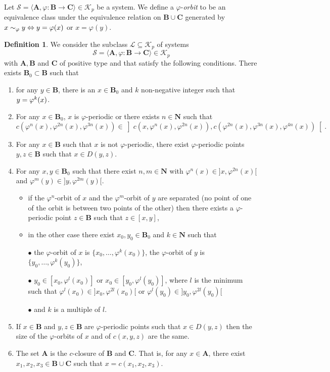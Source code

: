 \documentclass[JEP,XML,SOM,Unicode,NoFloatCountersInSection]{cedram}
\newcommand{\sbullet}{{\scriptscriptstyle\bullet}}
\newcommand\ssi{\mathchoice{\iff}{\Leftrightarrow}{\Leftrightarrow}{\Leftrightarrow}}
\let\mathcal\mathscr
\theoremstyle{plain}
\theoremstyle{definition}
\newtheorem{defn}[thm]{Definition}
\newcommand{\bA}{{\boldsymbol{A}}}
\newcommand{\bB}{{\boldsymbol{B}}}
\newcommand{\bC}{{\boldsymbol{C}}}
\newcommand{\NN}{\mathbf{N}}
\newcommand{\cK}{\mathcal{K}}
\newcommand{\cL}{\mathcal{L}}
\newcommand{\cS}{\mathcal{S}}
\begin{document}
Let $\cS=\langle \bA,\varphi\colon\bB\to\bC\rangle\in\cK_p$ be a system. We define a $\varphi$-\emph{orbit} to be an equivalence class under the equivalence relation on $\bB\cup\bC$ generated by $x\sim_\varphi y\ssi y=\varphi(x)$ or $x=\varphi(y)$.

\begin{defn}\label{class}We consider the subclass $\cL\!\subseteq\!\cK_p$ of systems
\[
\cS=\langle \bA,\varphi\colon\bB\!\to\!\bC\rangle\in\cK_p
\]
with $\bA,\bB$ and $\bC$ of positive type and that satisfy the following conditions. There exists $\bB_0\subset \bB$ such that
\begin{enumerate}
\item\label{class1} for any $y\in\bB$, there is an $x\in\bB_0$ and $k$ non-negative integer such that $y=\nobreak\varphi^k(x)$.
\item\label{class2} For any $x\in \bB_0$, $x$ is $\varphi$-periodic or there exists $n\in \NN$ such that
\[
c\left(\varphi^n(x),\varphi^{2n}(x),\varphi^{3n}(x)\right)\in\left]c\left(x,\varphi^n(x),\varphi^{2n}(x)\right),c\left(\varphi^{2n}(x),\varphi^{3n}(x),\varphi^{4n}(x)\right)\right[.
\]
\item\label{class3} For any $x\in \bB$ such that $x$ is not $\varphi$-periodic, there exist $\varphi$-periodic points $y,z\in \bB$ such that $x\in D(y,z)$.
\item\label{class4} For any $x,y\in\bB_0$ such that there exist $n,m\in\NN$ with $\varphi^n(x)\in{}]x,\varphi^{2n}(x)[$ and $\varphi^m(y)\in{}]y,\varphi^{2m}(y)[$.
\begin{itemize}
\item if the $\varphi^n$-orbit of $x$ and the $\varphi^m$-orbit of $y$ are separated (\ie no point of one of the orbit is between two points of the other) then there exists a $\varphi$-periodic point $z\in\bB$ such that $z\in [x,y]$,
\item in the other case there exist $x_0,y_0\in \bB_0$ and $k\in\NN$ such that

$\sbullet$ the $\varphi$-orbit of $x$ is $\{x_0,\dots,\varphi^{k}(x_0)\}$, the $\varphi$-orbit of $y$ is $\{y_0,\dots,\varphi^{k}(y_0)\}$,

$\sbullet$ $y_0\in[x_0,\varphi^l(x_0)]$ or $x_0\in[y_0,\varphi^l(y_0)]$, where $l$ is the minimum such that $\varphi^l(x_0)\in{}]x_0,\varphi^{2l}(x_0)[$ or $\varphi^l(y_0)\in{}]y_0,\varphi^{2l}(y_0)[$

$\sbullet$ and $k$ is a multiple of $l$.
\end{itemize}
\item\label{class5} If $x\in\bB$ and $y,z\in \bB$ are $\varphi$-periodic points such that $x\in D(y,z)$ then the size of the $\varphi$-orbits of $x$ and of $c(x,y,z)$ are the same.
\item\label{class6} The set $\bA$ is the $c$-closure of $\bB$ and $\bC$. That is, for any $x\in \bA$, there exist $x_1,x_2,x_3\in \bB\cup\bC$ such that $x=c(x_1,x_2,x_3)$.
\end{enumerate}
\end{defn}
\end{document}
